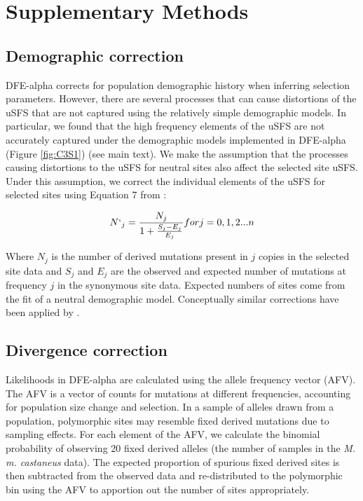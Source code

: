 \section{Supplementary Methods}
\subsection{Demographic correction}

DFE-alpha corrects for population demographic history when inferring selection parameters. However, there are several processes that can cause distortions of the uSFS that are not captured using the relatively simple demographic models. In particular, we found that the high frequency elements of the uSFS are not accurately captured under the demographic models implemented in DFE-alpha (Figure \ref{fig:C3S1}) (see main text). We make the assumption that the processes causing distortions to the uSFS for neutral sites also affect the selected site uSFS. Under this assumption, we correct the individual elements of the uSFS for selected sites using Equation 7 from \cite{RN321}:

\begin{equation}
N`_j = \frac{N_j}{1 + \frac{S_j - E_j}{E_j}} for j = 0,1,2 ... n
\end{equation}

Where $N_j$ is the number of derived mutations present in $j$ copies in the selected site data and $S_j$ and $E_j$ are the observed and expected number of mutations at frequency $j$ in the synonymous site data. Expected numbers of sites come from the fit of a neutral demographic model. Conceptually similar corrections have been applied by \cite{RN354,RN276,RN275}.

\subsection{Divergence correction}

Likelihoods in DFE-alpha are calculated using the allele frequency vector (AFV). The AFV is a vector of counts for mutations at different frequencies, accounting for population size change and selection. In a sample of alleles drawn from a population, polymorphic sites may resemble fixed derived mutations due to sampling effects. For each element of the AFV, we calculate the binomial probability of observing 20 fixed derived alleles (the number of samples in the \textit{M. m. castaneus} data). The expected proportion of spurious fixed derived sites is then subtracted from the observed data and re-distributed to the polymorphic bin using the AFV to apportion out the number of sites appropriately.

